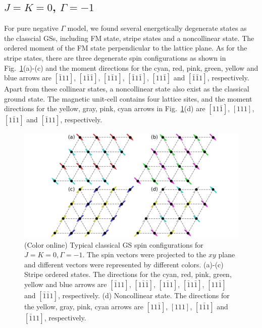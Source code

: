 \documentclass[aps,prb,reprint,amsfonts,amsmath,amssymb,showpacs,groupedaddress,superscriptaddress]{revtex4-1}
\begin{document}
\subsection{$J=K=0$, $\Gamma=-1$}

For pure negative $\Gamma$ model, we found several energetically degenerate states as the classcial GSs, including FM state, stripe states and a noncollinear state. The ordered moment of the FM state perpendicular to the lattice plane. As for the stripe states, there are three degenerate spin configurations as shown in Fig.~\ref{fig:GSForNegativeGamma}(a)-(c) and the moment directions for the cyan, red, pink, green, yellow and blue arrows are $[\bar{1}11]$, $[1\bar{1}\bar{1}]$, $[1\bar{1}1]$, $[\bar{1}1\bar{1}]$, $[11\bar{1}]$ and $[\bar{1}\bar{1}1]$, respectively. Apart from these collinear states, a noncollinear state also exist as the classical ground state. The magnetic unit-cell contains four lattice sites, and the moment directions for the yellow, gray, pink, cyan arrows in Fig.~\ref{fig:GSForNegativeGamma}(d) are $[11\bar{1}]$, $[111]$, $[1\bar{1}1]$ and $[\bar{1}11]$, respectively.
\begin{figure}
    \includegraphics[width=\columnwidth]{fig/SpinConfigForNegativeGamma.pdf}
    \caption{\label{fig:GSForNegativeGamma}(Color online) Typical classical GS spin configurations for $J=K=0, \Gamma=-1$. The spin vectors were projected to the $xy$ plane and different vectors were represented by different colors. (a)-(c) Stripe ordered states. The directions for the cyan, red, pink, green, yellow and blue arrows are $[\bar{1}11]$, $[1\bar{1}\bar{1}]$, $[1\bar{1}1]$, $[\bar{1}1\bar{1}]$, $[11\bar{1}]$ and $[\bar{1}\bar{1}1]$, respectively. (d) Noncollinear state. The directions for the yellow, gray, pink, cyan arrows are $[11\bar{1}]$, $[111]$, $[1\bar{1}1]$ and $[\bar{1}11]$, respectively.}
\end{figure}
\end{document}

